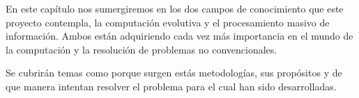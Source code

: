 En este cap\'itulo nos sumergiremos en los dos campos de conocimiento que este proyecto contempla, la computación evolutiva y el procesamiento masivo de información. Ambos están adquiriendo cada vez m\'as importancia en el mundo de la computación y la resolución de problemas no convencionales.

Se cubrir\'an temas como porque surgen estás metodologías, sus propósitos y de que manera intentan resolver el problema para el cual han sido desarrolladas.